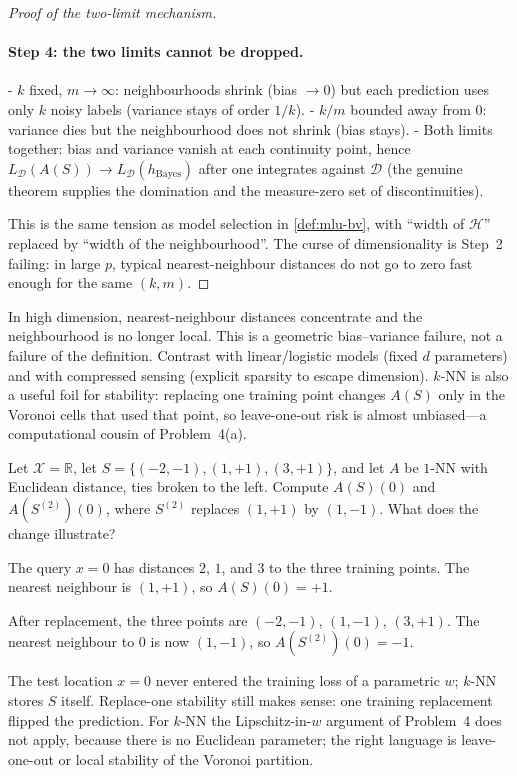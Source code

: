 \begin{proof}[Proof of the two-limit mechanism]
\paragraph{Step 4: the two limits cannot be dropped.}
- $k$ fixed, $m\to\infty$: neighbourhoods shrink (bias $\to 0$) but each prediction uses only $k$ noisy labels (variance stays of order $1/k$).
- $k/m$ bounded away from $0$: variance dies but the neighbourhood does not shrink (bias stays).
- Both limits together: bias and variance vanish at each continuity point, hence $L_{\mathcal{D}}(A(S))\to L_{\mathcal{D}}(h_{\mathrm{Bayes}})$ after one integrates against $\mathcal{D}$ (the genuine theorem supplies the domination and the measure-zero set of discontinuities).

This is the same tension as model selection in \cref{def:mlu-bv}, with ``width of $\mathcal{H}$'' replaced by ``width of the neighbourhood''. The curse of dimensionality is Step~2 failing: in large $p$, typical nearest-neighbour distances do not go to zero fast enough for the same $(k,m)$.
\end{proof}

\begin{remark}
In high dimension, nearest-neighbour distances concentrate and the neighbourhood is no longer local. This is a geometric bias--variance failure, not a failure of the definition. Contrast with linear/logistic models (fixed $d$ parameters) and with compressed sensing (explicit sparsity to escape dimension). $k$-NN is also a useful foil for stability: replacing one training point changes $A(S)$ only in the Voronoi cells that used that point, so leave-one-out risk is almost unbiased---a computational cousin of Problem~4(a).
\end{remark}

\begin{exercise}
\label{ex:mlu-1nn}
Let $\mathcal{X}=\mathbb{R}$, let $S=\{(-2,-1),(1,+1),(3,+1)\}$, and let $A$ be $1$-NN with Euclidean distance, ties broken to the left. Compute $A(S)(0)$ and $A(S^{(2)})(0)$, where $S^{(2)}$ replaces $(1,+1)$ by $(1,-1)$. What does the change illustrate?
\end{exercise}

\begin{solution}
The query $x=0$ has distances $2$, $1$, and $3$ to the three training points. The nearest neighbour is $(1,+1)$, so $A(S)(0)=+1$.

After replacement, the three points are $(-2,-1)$, $(1,-1)$, $(3,+1)$. The nearest neighbour to $0$ is now $(1,-1)$, so $A(S^{(2)})(0)=-1$.

The test location $x=0$ never entered the training loss of a parametric $w$; $k$-NN stores $S$ itself. Replace-one stability still makes sense: one training replacement flipped the prediction. For $k$-NN the Lipschitz-in-$w$ argument of Problem~4 does not apply, because there is no Euclidean parameter; the right language is leave-one-out or local stability of the Voronoi partition.
\end{solution}


